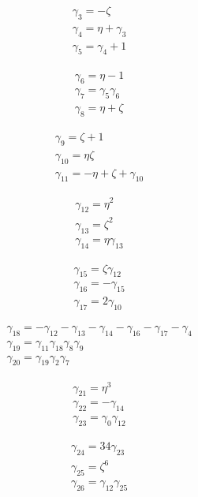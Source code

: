 \[\begin{aligned}\gamma_{3}=- \zeta \\ \gamma_{4}=\eta  + \gamma_{3}\\ \gamma_{5}=\gamma_{4} + 1\end{aligned}\]

\[\begin{aligned}\gamma_{6}=\eta  - 1\\ \gamma_{7}=\gamma_{5} \gamma_{6}\\ \gamma_{8}=\eta  + \zeta \end{aligned}\]

\[\begin{aligned}\gamma_{9}=\zeta  + 1\\ \gamma_{10}=\eta  \zeta \\ \gamma_{11}=- \eta  + \zeta  + \gamma_{10}\end{aligned}\]

\[\begin{aligned}\gamma_{12}=\eta ^{2}\\ \gamma_{13}=\zeta ^{2}\\ \gamma_{14}=\eta  \gamma_{13}\end{aligned}\]

\[\begin{aligned}\gamma_{15}=\zeta  \gamma_{12}\\ \gamma_{16}=- \gamma_{15}\\ \gamma_{17}=2 \gamma_{10}\end{aligned}\]

\[\begin{aligned}\gamma_{18}=- \gamma_{12} - \gamma_{13} - \gamma_{14} - \gamma_{16} - \gamma_{17} - \gamma_{4}\\ \gamma_{19}=\gamma_{11} \gamma_{18} \gamma_{8} \gamma_{9}\\ \gamma_{20}=\gamma_{19} \gamma_{2} \gamma_{7}\end{aligned}\]

\[\begin{aligned}\gamma_{21}=\eta ^{3}\\ \gamma_{22}=- \gamma_{14}\\ \gamma_{23}=\gamma_{0} \gamma_{12}\end{aligned}\]

\[\begin{aligned}\gamma_{24}=34 \gamma_{23}\\ \gamma_{25}=\zeta ^{6}\\ \gamma_{26}=\gamma_{12} \gamma_{25}\end{aligned}\]

